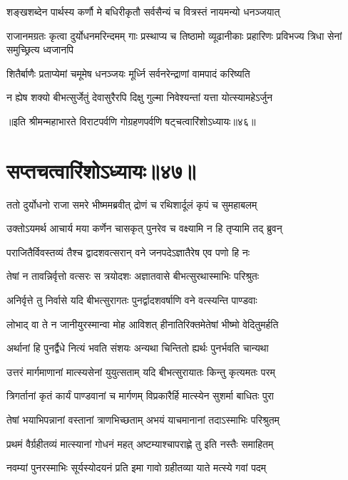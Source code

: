 \twolineshloka
{शङ्खशब्देन पार्थस्य कर्णौ मे बधिरीकृतौ}
{सर्वसैन्यं च वित्रस्तं नायमन्यो धनञ्जयात्}


\threelineshloka
{राजानमग्रतः कृत्वा दुर्योधनमरिन्दमम्}
{गाः प्रस्थाप्य च तिष्ठामो व्यूढानीकाः प्रहारिणः}
{प्रविभज्य त्रिधा सेनां समुच्छ्रित्य ध्वजानपि}


\twolineshloka
{शितैर्बाणैः प्रताप्येमां चमूमेष धनञ्जयः}
{मूर्ध्नि सर्वनरेन्द्राणां वामपादं करिष्यति}


\twolineshloka
{न ह्येष शक्यो बीभत्सुर्जेतुं देवासुरैरपि}
{दिक्षु गुल्मा निवेश्यन्तां यत्ता योत्स्यामहेऽर्जुन}

॥इति श्रीमन्महाभारते विराटपर्वणि गोग्रहणपर्वणि षट्चत्वारिंशोऽध्यायः॥४६॥

\chapter{सप्तचत्वारिंशोऽध्यायः॥४७॥}

\twolineshloka
{ततो दुर्योधनो राजा समरे भीष्ममब्रवीत्}
{द्रोणं च रथिशार्दूलं कृपं च सुमहाबलम्}


\twolineshloka
{उक्तोऽयमर्थ आचार्य मया कर्णेन चासकृत्}
{पुनरेव च वक्ष्यामि न हि तृप्यामि तद् ब्रुवन्}


\twolineshloka
{पराजितैर्विवस्तव्यं तैश्च द्वादशवत्सरान्}
{वने जनपदेऽज्ञातैरेष एव पणो हि नः}


\twolineshloka
{तेषां न तावन्निर्वृत्तो वत्सरः स त्रयोदशः}
{अज्ञातवासे बीभत्सुरथास्माभिः परिश्रुतः}


\twolineshloka
{अनिर्वृत्ते तु निर्वासे यदि बीभत्सुरागतः}
{पुनर्द्वादशवर्षाणि वने वत्स्यन्ति पाण्डवाः}


\twolineshloka
{लोभाद् वा ते न जानीयुरस्मान्वा मोह आविशत्}
{हीनातिरिक्तमेतेषां भीष्मो वेदितुमर्हति}


\twolineshloka
{अर्थानां हि पुनर्द्वैधे नित्यं भवति संशयः}
{अन्यथा चिन्तितो ह्यर्थः पुनर्भवति चान्यथा}


\twolineshloka
{उत्तरं मार्गमाणानां मात्स्यसेनां युयुत्सताम्}
{यदि बीभत्सुरायातः किन्तु कृत्यमतः परम्}


\twolineshloka
{त्रिगर्तानां कृतं कार्यं पाण्डवानां च मार्गणम्}
{विप्रकारैर्हि मात्स्येन सुशर्मा बाधितः पुरा}


\twolineshloka
{तेषां भयाभिपन्नानां वस्तानां त्राणभिच्छताम्}
{अभयं याचमानानां तदाऽस्माभिः परिश्रुतम्}


\twolineshloka
{प्रथमं वैर्ग्रहीतव्यं मात्स्यानां गोधनं महत्}
{अष्टम्याश्चापराह्णे तु इति नस्तैः समाहितम्}


\twolineshloka
{नवम्यां पुनरस्माभिः सूर्यस्योदयनं प्रति}
{इमा गावो ग्रहीतव्या याते मत्स्ये गवां पदम्}


